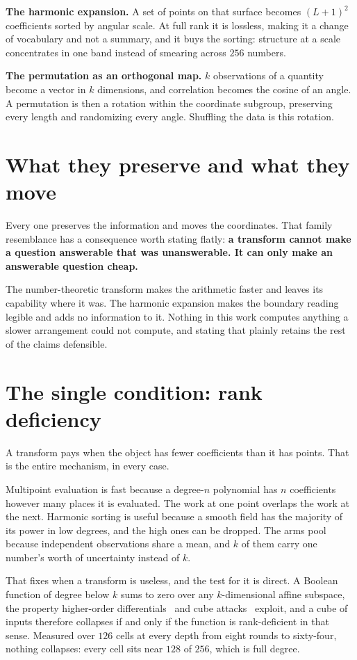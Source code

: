 \textbf{The harmonic expansion.} A set of points on that surface becomes \((L+1)^2\) coefficients sorted by angular scale. At full rank it is lossless, making it a change of vocabulary and not a summary, and it buys the sorting: structure at a scale concentrates in one band instead of smearing across \(256\) numbers.

\textbf{The permutation as an orthogonal map.} \(k\) observations of a quantity become a vector in \(k\) dimensions, and correlation becomes the cosine of an angle. A permutation is then a rotation within the coordinate subgroup, preserving every length and randomizing every angle. Shuffling the data is this rotation.

\section{What they preserve and what they move}

Every one preserves the information and moves the coordinates. That family resemblance has a consequence worth stating flatly: \textbf{a transform cannot make a question answerable that was unanswerable. It can only make an answerable question cheap.}

The number-theoretic transform makes the arithmetic faster and leaves its capability where it was. The harmonic expansion makes the boundary reading legible and adds no information to it. Nothing in this work computes anything a slower arrangement could not compute, and stating that plainly retains the rest of the claims defensible.

\section{The single condition: rank deficiency}

A transform pays when the object has fewer coefficients than it has points. That is the entire mechanism, in every case.

Multipoint evaluation is fast because a degree-\(n\) polynomial has \(n\) coefficients however many places it is evaluated. The work at one point overlaps the work at the next. Harmonic sorting is useful because a smooth field has the majority of its power in low degrees, and the high ones can be dropped. The arms pool because independent observations share a mean, and \(k\) of them carry one number's worth of uncertainty instead of \(k\).

That fixes when a transform is useless, and the test for it is direct. A Boolean function of degree below \(k\) sums to zero over any \(k\)-dimensional affine subspace, the property higher-order differentials~\cite{src:Lai-1994} and cube attacks~\cite{src:Dinur-and-Shamir-2009} exploit, and a cube of inputs therefore collapses if and only if the function is rank-deficient in that sense. Measured over \(126\) cells at every depth from eight rounds to sixty-four, nothing collapses: every cell sits near \(128\) of \(256\), which is full degree.

